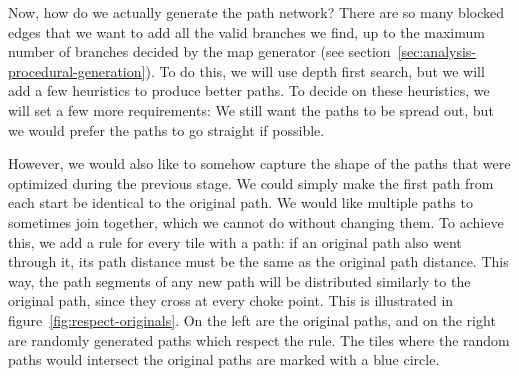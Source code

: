 Now, how do we actually generate the path network?
There are so many blocked edges that we want to add all the valid branches we find, up to the maximum number of branches decided by the map generator (see section~\ref{sec:analysis-procedural-generation}).
To do this, we will use depth first search, but we will add a few heuristics to produce better paths.
To decide on these heuristics, we will set a few more requirements:
We still want the paths to be spread out, but we would prefer the paths to go straight if possible.

However, we would also like to somehow capture the shape of the paths that were optimized during the previous stage.
We could simply make the first path from each start be identical to the original path.
We would like multiple paths to sometimes join together, which we cannot do without changing them.
To achieve this, we add a rule for every tile with a path: if an original path also went through it, its path distance must be the same as the original path distance.
This way, the path segments of any new path will be distributed similarly to the original path, since they cross at every choke point.
This is illustrated in figure~\ref{fig:respect-originals}.
On the left are the original paths, and on the right are randomly generated paths which respect the rule.
The tiles where the random paths would intersect the original paths are marked with a blue circle.

